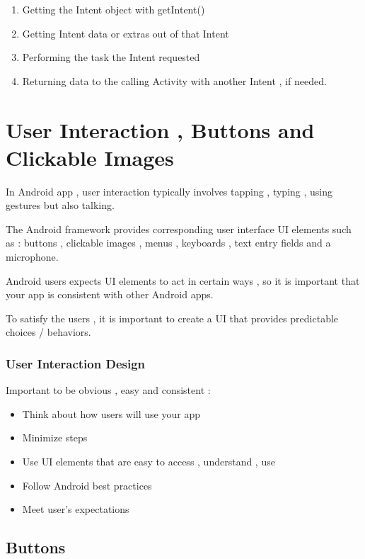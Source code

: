 \documentclass{article}
\begin{document}
  \begin{enumerate}
      \item Getting the Intent object with getIntent()
      \item Getting Intent data or extras out of that Intent
      \item Performing the task the Intent requested
      \item Returning data to the calling Activity with another Intent , if needed.
  \end{enumerate}

\section{User Interaction , Buttons and Clickable Images}

In Android app , user interaction typically involves tapping , typing , using gestures but also talking.

The Android framework provides corresponding user interface UI elements such as : buttons , clickable images , menus , keyboards , text entry fields and a microphone.

Android users expects UI elements to act in certain ways , so it is important that your app is consistent with other Android apps.

To satisfy the users , it is important to create a UI that provides predictable choices / behaviors.

\subsubsection{User Interaction Design}

Important to be obvious , easy and consistent : 

\begin{itemize}
    \item Think about how users will use your app
    \item Minimize steps
    \item Use UI elements that are easy to access , understand , use
    \item Follow Android best practices 
    \item Meet user's expectations
\end{itemize}

\subsection{Buttons}
\end{document}
